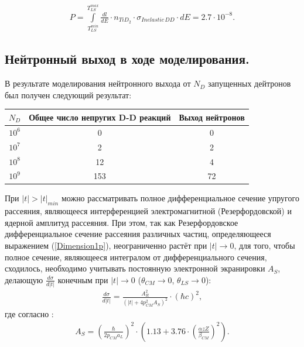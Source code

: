 \documentclass[a4paper,12pt]{article}
\begin{document}
\begin{large}
\begin{equation}
\label{ProbabilityOfNeutronOutputPer1Deuteron}
\begin{aligned} 
  P = \int \limits^{T^{max}_{LS}}_{T^{min}_{LS}} \frac{dl}{dE} \cdot n_{TiD_2} \cdot \sigma_{Inelastic\,DD} \cdot dE = 2.7 \cdot 10^{-8}.
\end{aligned}
\end{equation}

\subsection{Нейтронный выход в ходе моделирования.}
\label{NeutronOutputInModelling}

	В результате моделирования нейтронного выхода от $N_D$ запущенных дейтронов был получен следующий результат:
	
\begin{tabular}{|c|c|c|}
 \hline 
 $N_D$ & Общее число непругих D-D реакций & Выход нейтронов \\ 
 \hline 
 $10^6$ & 0 & 0 \\ 
 \hline 
 $10^7$ & 2 & 2 \\ 
 \hline 
 $10^8$ & 12 & 4 \\ 
 \hline 
 $10^9$ & 153 & 72 \\ 
 \hline 
 \end{tabular}
 
 
 
	 
	
	
	





	
	
	
  При $|t|>|t|_{min}$ можно рассматривать полное дифференциальное сечение упругого рассеяния, являющееся интерференцией электромагнитной (Резерфордовской) и ядерной амплитуд рассеяния.
  При этом, так как Резерфордовское дифференциальное сечение рассеяния различных частиц, определяющееся выражением (\ref{Dimension1p}), неограниченно растёт при $|t| \to 0$, для того, чтобы полное сечение, являющееся интегралом от дифференциального сечения, сходилось, необходимо учитывать постоянную электронной экранировки $A_S$, делающую $\frac{d\sigma}{d|t|}$ конечным при $|t| \to 0$ ($\theta_{CM} \to 0$, $\theta_{LS} \to 0$):
\begin{equation}
 \begin{aligned} 
 \label{MS1}     
      \frac{d\sigma}{d|t|}=  
      \frac{A_R^2}{\left( |t| + 4 p_{CM}^2 A_S \right)^2} \cdot \left( \hbar c \right)^2,
 \end{aligned}
\end{equation}
где согласно \cite{G4IonIon}:
\begin{equation}
\label{MSAs}
\begin{aligned} 
A_S= \left( \frac{ \hbar }{ 2 p_{CM} a_L } \right)^2 \cdot \left( 1.13 + 3.76 \cdot \left( \frac{ \alpha z Z}{\beta_{CM}} \right)^2 \right).
\end{aligned}
\end{equation}


\end{large}
\end{document}
